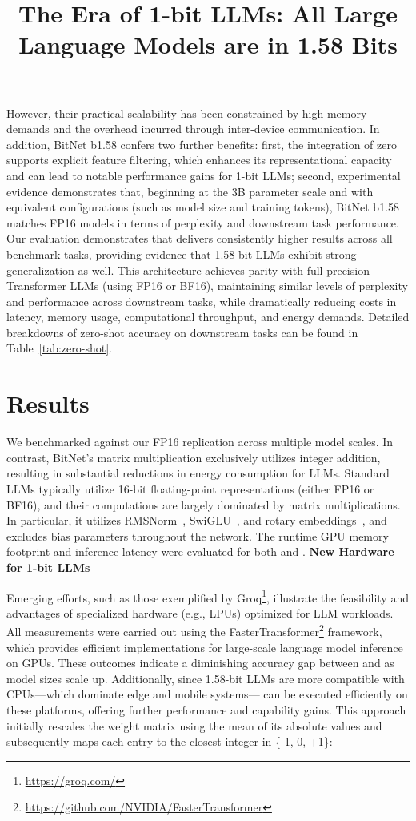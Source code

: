 \title{The Era of 1-bit LLMs: All Large Language Models are in 1.58 Bits}
However, their practical scalability has been constrained by high memory demands and the overhead incurred through inter-device communication. In addition, BitNet b1.58 confers two further benefits: first, the integration of zero supports explicit feature filtering, which enhances its representational capacity and can lead to notable performance gains for 1-bit LLMs; second, experimental evidence demonstrates that, beginning at the 3B parameter scale and with equivalent configurations (such as model size and training tokens), BitNet b1.58 matches FP16 models in terms of perplexity and downstream task performance. Our evaluation demonstrates that  delivers consistently higher results across all benchmark tasks, providing evidence that 1.58-bit LLMs exhibit strong generalization as well. This architecture achieves parity with full-precision Transformer LLMs (using FP16 or BF16), maintaining similar levels of perplexity and performance across downstream tasks, while dramatically reducing costs in latency, memory usage, computational throughput, and energy demands. Detailed breakdowns of zero-shot accuracy on downstream tasks can be found in Table~\ref{tab:zero-shot}. \section{Results}

We benchmarked  against our FP16  replication across multiple model scales. In contrast, BitNet's matrix multiplication exclusively utilizes integer addition, resulting in substantial reductions in energy consumption for LLMs. Standard LLMs typically utilize 16-bit floating-point representations (either FP16 or BF16), and their computations are largely dominated by matrix multiplications. In particular, it utilizes RMSNorm~\cite{rmsnorm}, SwiGLU~\cite{swiglu}, and rotary embeddings~\cite{rope}, and excludes bias parameters throughout the network. The runtime GPU memory footprint and inference latency were evaluated for both  and . \textbf{New Hardware for 1-bit LLMs}

Emerging efforts, such as those exemplified by Groq\footnote{\url{https://groq.com/}}, illustrate the feasibility and advantages of specialized hardware (e.g., LPUs) optimized for LLM workloads. All measurements were carried out using the FasterTransformer\footnote{\url{https://github.com/NVIDIA/FasterTransformer}} framework, which provides efficient implementations for large-scale language model inference on GPUs. These outcomes indicate a diminishing accuracy gap between  and  as model sizes scale up. Additionally, since 1.58-bit LLMs are more compatible with CPUs—which dominate edge and mobile systems— can be executed efficiently on these platforms, offering further performance and capability gains. This approach initially rescales the weight matrix using the mean of its absolute values and subsequently maps each entry to the closest integer in \{-1, 0, +1\}:

